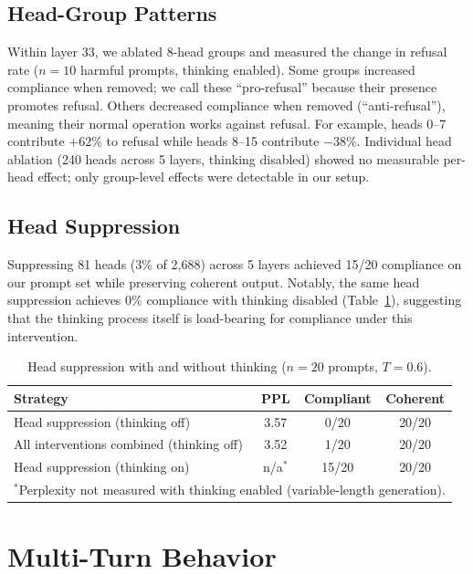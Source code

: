 \documentclass{article}
\begin{document}
\subsection{Head-Group Patterns}

Within layer 33, we ablated 8-head groups and measured the change in refusal rate ($n = 10$ harmful prompts, thinking enabled). Some groups increased compliance when removed; we call these ``pro-refusal'' because their presence promotes refusal. Others decreased compliance when removed (``anti-refusal''), meaning their normal operation works against refusal. For example, heads 0--7 contribute $+62\%$ to refusal while heads 8--15 contribute $-38\%$. Individual head ablation (240 heads across 5 layers, thinking disabled) showed no measurable per-head effect; only group-level effects were detectable in our setup.

\subsection{Head Suppression}

Suppressing 81 heads (3\% of 2{,}688) across 5 layers achieved 15/20 compliance on our prompt set while preserving coherent output. Notably, the same head suppression achieves 0\% compliance with thinking disabled (Table~\ref{tab:strategies}), suggesting that the thinking process itself is load-bearing for compliance under this intervention.

\begin{table}[h]
\centering
\small
\caption{Head suppression with and without thinking ($n = 20$ prompts, $T = 0.6$).}
\label{tab:strategies}
\begin{tabular}{lccc}
\toprule
\textbf{Strategy} & \textbf{PPL} & \textbf{Compliant} & \textbf{Coherent} \\
\midrule
Head suppression (thinking off) & 3.57 & 0/20 & 20/20 \\
All interventions combined (thinking off) & 3.52 & 1/20 & 20/20 \\
Head suppression (thinking on) & n/a$^*$ & 15/20 & 20/20 \\
\multicolumn{4}{l}{\footnotesize $^*$Perplexity not measured with thinking enabled (variable-length generation).} \\
\bottomrule
\end{tabular}
\end{table}

\section{Multi-Turn Behavior}
\label{sec:multiturn}
\end{document}
